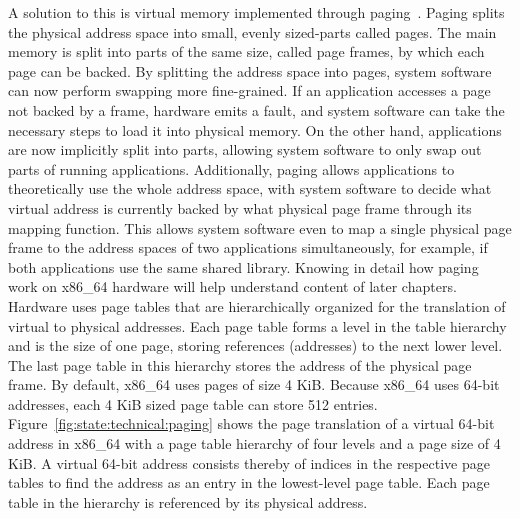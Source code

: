 A solution to this is virtual memory implemented through
paging~\cite{tanenbaum2015modern}. Paging splits the physical address space into
small, evenly sized-parts called pages. The main memory is split into parts of
the same size, called page frames, by which each page can be backed. By
splitting the address space into pages, system software can now perform swapping
more fine-grained. If an application accesses a page not backed by a frame,
hardware emits a fault, and system software can take the necessary steps to load
it into physical memory. On the other hand, applications are now implicitly
split into parts, allowing system software to only swap out parts of running
applications. Additionally, paging allows applications to theoretically use the
whole address space, with system software to decide what virtual address is
currently backed by what physical page frame through its mapping function. This
allows system software even to map a single physical page frame to the address
spaces of two applications simultaneously, for example, if both applications use
the same shared library. Knowing in detail how paging work on x86\_64 hardware
will help understand content of later chapters.\\

Hardware uses page tables that are hierarchically organized for the translation
of virtual to physical addresses. Each page table forms a level in the table
hierarchy and is the size of one page, storing references (addresses) to the
next lower level. The last page table in this hierarchy stores the address of
the physical page frame. By default, x86\_64 uses pages of size 4 KiB. Because
x86\_64 uses 64-bit addresses, each 4 KiB sized page table can store 512
entries. Figure~\ref{fig:state:technical:paging} shows the page translation of a
virtual 64-bit address in x86\_64 with a page table hierarchy of four levels and
a page size of 4 KiB. A virtual 64-bit address consists thereby of indices in
the respective page tables to find the address as an entry in the lowest-level
page table. Each page table in the hierarchy is referenced by its physical
address.\\

